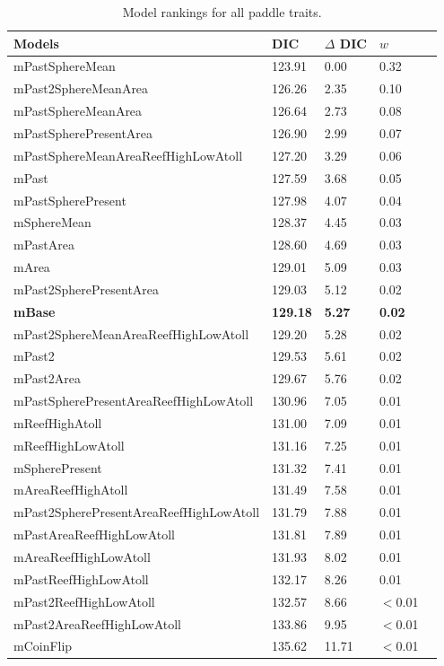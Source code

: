 \begin{table}
\begin{center}
\begin{tabular}{lllll}
Models & DIC & $\Delta$ DIC & $w$\\
\hline
mPastSphereMean & 123.91 & 0.00 & 0.32\\
mPast2SphereMeanArea & 126.26 & 2.35 & 0.10\\
mPastSphereMeanArea & 126.64 & 2.73 & 0.08\\
mPastSpherePresentArea & 126.90 & 2.99 & 0.07\\
mPastSphereMeanAreaReefHighLowAtoll & 127.20 & 3.29 & 0.06\\
mPast & 127.59 & 3.68 & 0.05\\
mPastSpherePresent & 127.98 & 4.07 & 0.04\\
mSphereMean & 128.37 & 4.45 & 0.03\\
mPastArea & 128.60 & 4.69 & 0.03\\
mArea & 129.01 & 5.09 & 0.03\\
mPast2SpherePresentArea & 129.03 & 5.12 & 0.02\\
\textbf{mBase} & \textbf{129.18} & \textbf{5.27} & \textbf{0.02}\\
mPast2SphereMeanAreaReefHighLowAtoll & 129.20 & 5.28 & 0.02\\
mPast2 & 129.53 & 5.61 & 0.02\\
mPast2Area & 129.67 & 5.76 & 0.02\\
mPastSpherePresentAreaReefHighLowAtoll & 130.96 & 7.05 & 0.01\\
mReefHighAtoll & 131.00 & 7.09 & 0.01\\
mReefHighLowAtoll & 131.16 & 7.25 & 0.01\\
mSpherePresent & 131.32 & 7.41 & 0.01\\
mAreaReefHighAtoll & 131.49 & 7.58 & 0.01\\
mPast2SpherePresentAreaReefHighLowAtoll & 131.79 & 7.88 & 0.01\\
mPastAreaReefHighLowAtoll & 131.81 & 7.89 & 0.01\\
mAreaReefHighLowAtoll & 131.93 & 8.02 & 0.01\\
mPastReefHighLowAtoll & 132.17 & 8.26 & 0.01\\
mPast2ReefHighLowAtoll & 132.57 & 8.66 & $<$0.01\\
mPast2AreaReefHighLowAtoll & 133.86 & 9.95 & $<$0.01\\
mCoinFlip & 135.62 & 11.71 & $<$0.01\\
\end{tabular}
\end{center}
\caption{Model rankings for all paddle traits.
\label{resultstable6}}
\end{table}



